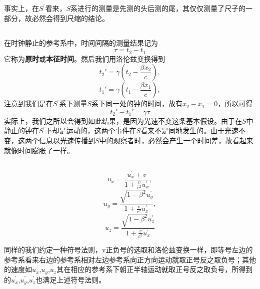 事实上，在$S^{\prime}$看来，$S$系进行的测量是先测的头后测的尾，其仅仅测量了尺子的一部分，故必然会得到尺缩的结论。
\subsection[动钟变慢]{}
在时钟静止的参考系中，时间间隔的测量结果记为
\[\tau=t_2-t_1\] 
它称为\textbf{原时}或\textbf{本征时间}。然后我们用洛伦兹变换得到
\[t_{2}'=\gamma\left(t_{2}-\frac{\beta x_{2}}{c}\right),\]
\[t_{1}'=\gamma\left(t_{1}-\frac{\beta x_{1}}{c}\right),\]
注意到我们是在$S^{\prime}$系下测量$S$系下同一处的钟的时间，故有$x_2-x_1=0$，所以可得
\[t_{2}'-t_{1}'=\gamma \tau\]
实际上，我们之所以会得到如此结果，是因为光速不变这条基本假设。由于在$S$中静止的钟在$S^{\prime}$下却是运动的，这两个事件在$S$看来不是同地发生的。由于光速不变，这两个信息以光速传播到$S$中的观察者时，必然会产生一个时间差，故看起来就像时间膨胀了一样。
\subsection[速度变换]{}
\begin{law}
    \[u_{x}=\frac{u_{x}^{\prime}+v}{1+\frac{v}{c^{2}}u_{x}^{\prime}},\]
    \[u_{y}=\frac{\sqrt{1-\beta^{2}}u_{y}^{\prime}}{1+\frac{v}{c^{2}}u_{x}^{\prime}},\]
    \[u_{z}=\frac{\sqrt{1-\beta^{2}}u_{z}^{\prime}}{1+\frac{v}{c^{2}}u_{x}^{\prime}}\]
\end{law}
同样的我们约定一种符号法则，v正负号的选取和洛伦兹变换一样，即等号左边的参考系看来右边的参考系相对左边参考系向正方向运动就取正号反之取负号；其他的速度如$u_{x}$,$u_{y}$,$u_{z}$其在相应的参考系下朝正半轴运动就取正号反之取负号，所得到的$u_{x}^{\prime}$,$u_{y}^{\prime}$,$u_{z}^{\prime}$也满足上述符号法则。
